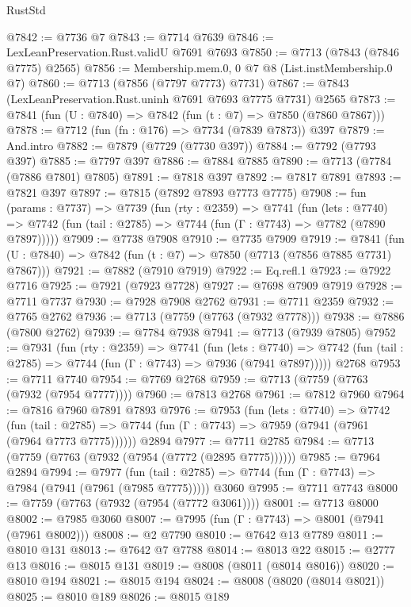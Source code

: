 \begin{lexlean}{RustStd}
\begin{coremodule}
@7842 := @7736 @7
@7843 := @7714 @7639
@7846 := LexLeanPreservation.Rust.validU @7691 @7693
@7850 := @7713 (@7843 (@7846 @7775) @2565)
@7856 := Membership.mem.{0, 0} @7 @8 (List.instMembership.{0} @7)
@7860 := @7713 (@7856 (@7797 @7773) @7731)
@7867 := @7843 (LexLeanPreservation.Rust.uninh @7691 @7693 @7775 @7731) @2565
@7873 := @7841 (fun (U : @7840) => @7842 (fun (t : @7) => @7850 (@7860 @7867)))
@7878 := @7712 (fun (fn : @176) => @7734 (@7839 @7873)) @397
@7879 := And.intro
@7882 := @7879 (@7729 (@7730 @397))
@7884 := @7792 (@7793 @397)
@7885 := @7797 @397
@7886 := @7884 @7885
@7890 := @7713 (@7784 (@7886 @7801) @7805)
@7891 := @7818 @397
@7892 := @7817 @7891
@7893 := @7821 @397
@7897 := @7815 (@7892 @7893 @7773 @7775)
@7908 := fun (params : @7737) =>
  @7739
    (fun (rty : @2359) =>
    @7741
      (fun (lets : @7740) =>
      @7742 (fun (tail : @2785) => @7744 (fun (Γ : @7743) => @7782 (@7890 @7897)))))
@7909 := @7738 @7908
@7910 := @7735 @7909
@7919 := @7841 (fun (U : @7840) => @7842 (fun (t : @7) => @7850 (@7713 (@7856 @7885 @7731) @7867)))
@7921 := @7882 (@7910 @7919)
@7922 := Eq.refl.{1}
@7923 := @7922 @7716
@7925 := @7921 (@7923 @7728)
@7927 := @7698 @7909 @7919
@7928 := @7711 @7737
@7930 := @7928 @7908 @2762
@7931 := @7711 @2359
@7932 := @7765 @2762
@7936 := @7713 (@7759 (@7763 (@7932 @7778)))
@7938 := @7886 (@7800 @2762)
@7939 := @7784 @7938
@7941 := @7713 (@7939 @7805)
@7952 := @7931
    (fun (rty : @2359) =>
    @7741
      (fun (lets : @7740) =>
      @7742 (fun (tail : @2785) => @7744 (fun (Γ : @7743) => @7936 (@7941 @7897)))))
    @2768
@7953 := @7711 @7740
@7954 := @7769 @2768
@7959 := @7713 (@7759 (@7763 (@7932 (@7954 @7777))))
@7960 := @7813 @2768
@7961 := @7812 @7960
@7964 := @7816 @7960 @7891 @7893
@7976 := @7953
    (fun (lets : @7740) =>
    @7742
      (fun (tail : @2785) => @7744 (fun (Γ : @7743) => @7959 (@7941 (@7961 (@7964 @7773 @7775))))))
    @2894
@7977 := @7711 @2785
@7984 := @7713 (@7759 (@7763 (@7932 (@7954 (@7772 (@2895 @7775))))))
@7985 := @7964 @2894
@7994 := @7977
    (fun (tail : @2785) => @7744 (fun (Γ : @7743) => @7984 (@7941 (@7961 (@7985 @7775)))))
    @3060
@7995 := @7711 @7743
@8000 := @7759 (@7763 (@7932 (@7954 (@7772 @3061))))
@8001 := @7713 @8000
@8002 := @7985 @3060
@8007 := @7995 (fun (Γ : @7743) => @8001 (@7941 (@7961 @8002)))
@8008 := @2 @7790
@8010 := @7642 @13 @7789
@8011 := @8010 @131
@8013 := @7642 @7 @7788
@8014 := @8013 @22
@8015 := @2777 @13
@8016 := @8015 @131
@8019 := @8008 (@8011 (@8014 @8016))
@8020 := @8010 @194
@8021 := @8015 @194
@8024 := @8008 (@8020 (@8014 @8021))
@8025 := @8010 @189
@8026 := @8015 @189

\end{coremodule}
\end{lexlean}
